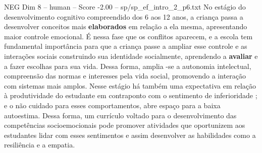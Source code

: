 \begin{textsample}{NEG Dim 8 – human – Score -2.00 – sp/sp\_ef\_intro\_2\_p6.txt}  \label{ex:f8_neg_002}
No estágio do desenvolvimento cognitivo compreendido dos 6 aos 12 anos, a criança passa a desenvolver conceitos mais \textbf{elaborados} em relação a ela mesma, apresentando maior controle emocional. É nessa fase que os conflitos aparecem, e a escola tem fundamental importância para que a criança passe a ampliar esse controle e as interações sociais construindo sua identidade socialmente, aprendendo a \textbf{avaliar} e a fazer escolhas para sua vida.
Dessa forma, amplia -se a autonomia intelectual, compreensão das normas e interesses pela vida social, promovendo a interação com sistemas mais amplos.
Nesse estágio há também uma expectativa em relação à produtividade do estudante em contraponto com o sentimento de inferioridade ; e o não cuidado para esses comportamentos, abre espaço para a baixa autoestima.
Dessa forma, um currículo voltado para o desenvolvimento das competências socioemocionais pode promover atividades que oportunizem aos estudantes lidar com esses sentimentos e assim desenvolver as habilidades como a resiliência e a empatia.

\end{textsample}
